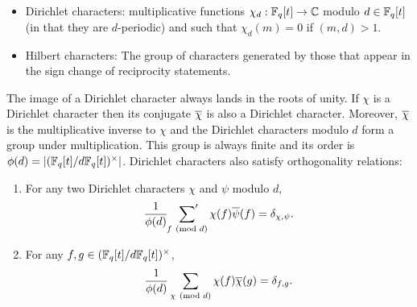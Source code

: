 \documentclass[12pt,reqno,oneside]{amsart}
\begin{document}
    \begin{itemize}
        \item Dirichlet characters: multiplicative functions $\chi_{d}:\mathbb{F}_{q}[t] \to \mathbb{C}$ modulo $d \in \mathbb{F}_{q}[t]$ (in that they are $d$-periodic) and such that $\chi_{d}(m) = 0$ if $(m,d) > 1$.
        \item Hilbert characters: The group of characters generated by those that appear in the sign change of reciprocity statements.
    \end{itemize}
    
    The image of a Dirichlet character always lands in the roots of unity. If $\chi$ is a Dirichlet character then its conjugate $\overline{\chi}$ is also a Dirichlet character. Moreover, $\overline{\chi}$ is the multiplicative inverse to $\chi$ and the Dirichlet characters modulo $d$ form a group under multiplication. This group is always finite and its order is $\phi(d) = |(\mathbb{F}_{q}[t]/d\mathbb{F}_{q}[t])^{\times}|$. Dirichlet characters also satisfy orthogonality relations:

    \begin{theorem}
        \phantom{ }
        \begin{enumerate}[label=(\roman*)]
          \item For any two Dirichlet characters $\chi$ and $\psi$ modulo $d$,
          \[
            \frac{1}{\phi(d)}\sideset{}{'}\sum_{f \ \left(\text{mod }d\right)}\chi(f)\overline{\psi}(f) = \delta_{\chi,\psi}.
          \]
          \item For any $f,g \in (\mathbb{F}_{q}[t]/d\mathbb{F}_{q}[t])^{\times}$,
          \[
            \frac{1}{\phi(d)}\sum_{\chi \ \left(\text{mod }d\right)}\chi(f)\overline{\chi}(g) = \delta_{f,g}.
          \]
        \end{enumerate}
    \end{theorem}
\end{document}
